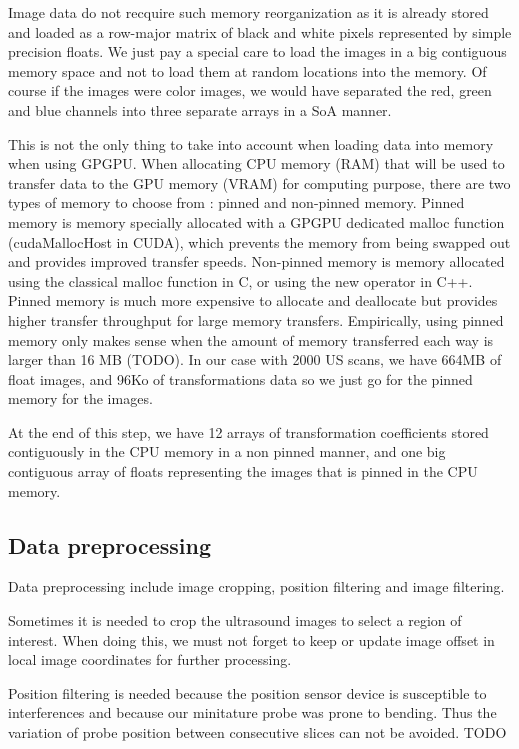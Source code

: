 \documentclass[12pt,journal,compsoc]{IEEEtran}
\begin{document}
Image data do not recquire such memory reorganization as it is already stored and loaded as a row-major matrix of black and white pixels represented by simple precision floats. We just pay a special care to load the images in a big contiguous memory space and not to load them at random locations into the memory.
Of course if the images were color images, we would have separated the red, green and blue channels into three separate arrays in a SoA manner. \par

This is not the only thing to take into account when loading data into memory when using GPGPU.
When allocating CPU memory (RAM) that will be used to transfer data to the GPU memory (VRAM) for computing purpose, there are two types of memory to choose from : pinned and non-pinned memory. 
Pinned memory is memory specially allocated with a GPGPU dedicated malloc function (cudaMallocHost in CUDA), which prevents the memory from being swapped out and provides improved transfer speeds. 
Non-pinned memory is memory allocated using the classical malloc function in C, or using the new operator in C++. 
Pinned memory is much more expensive to allocate and deallocate but provides higher transfer throughput for large memory transfers.
Empirically, using pinned memory only makes sense when the amount of memory transferred each way is larger than 16 MB (TODO). 
In our case with 2000 US scans, we have 664MB of float images, and 96Ko of transformations data so we just go for the pinned memory for the images. \par

At the end of this step, we have 12 arrays of transformation coefficients stored contiguously in the CPU memory in a non pinned manner, and one big contiguous array of floats representing the images that is pinned in the CPU memory. 

\subsection{Data preprocessing}


Data preprocessing include image cropping, position filtering and image filtering.\par

Sometimes it is needed to crop the ultrasound images to select a region of interest. When doing this, we must not forget to keep or update image offset in local image coordinates for further processing. 

Position filtering is needed because the position sensor device is susceptible to interferences and because our minitature probe was prone to bending. Thus the variation of probe position between consecutive slices can not be avoided. TODO\par
\end{document}
